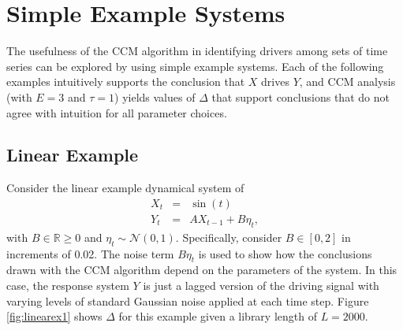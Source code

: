 \documentclass[twocolumn,aps,pre,groupedaddress]{revtex4-1}
\begin{document}
\section{Simple Example Systems}
The usefulness of the CCM algorithm in identifying drivers among sets of time series can be explored by using simple example systems.  Each of the following examples intuitively supports the conclusion that $X$ drives $Y$, and CCM analysis (with $E=3$ and $\tau=1$) yields values of $\Delta$ that support conclusions that do not agree with intuition for all parameter choices.

\subsection{Linear Example}
Consider the linear example dynamical system of
\begin{eqnarray}
\label{eq:linearex}
X_t &=& \sin(t)\\
Y_t &=& AX_{t-1}+B\eta_t,
\end{eqnarray}
with $B\in\mathbb{R}\ge 0$ and $\eta_t\sim\mathcal{N}\left(0,1\right)$.  Specifically, consider $B\in[0,2]$ in increments of 0.02.  The noise term $B\eta_t$ is used to show how the conclusions drawn with the CCM algorithm depend on the parameters of the system.  In this case, the response system $Y$ is just a lagged version of the driving signal with varying levels of standard Gaussian noise applied at each time step.  Figure \ref{fig:linearex1} shows $\Delta$ for this example given a library length of $L=2000$.
\end{document}
